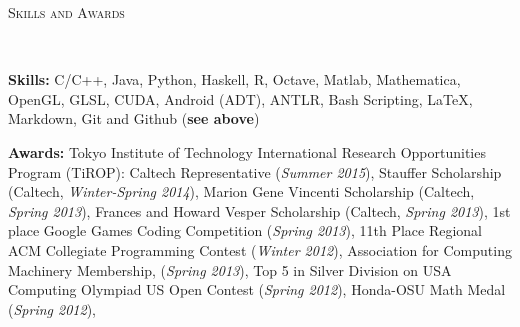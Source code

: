 \documentclass[9pt]{article}
\newenvironment{changemargin}[2]{%
  \begin{list}{}{%
    \setlength{\topsep}{0pt}%
    \setlength{\leftmargin}{#1}%
    \setlength{\rightmargin}{#2}%
    \setlength{\listparindent}{\parindent}%
    \setlength{\itemindent}{\parindent}%
    \setlength{\parsep}{\parskip}%
  }%
  \item[]}{\end{list}
}
\newcommand{\lineover}{
	\begin{changemargin}{-0.05in}{-0.05in}
		\vspace*{-8pt}
		\hrulefill \\
		\vspace*{-2pt}
	\end{changemargin}
}
\newcommand{\header}[1]{
	\begin{changemargin}{-0.5in}{-0.5in}
		\scshape{#1}\\
  	\lineover
	\end{changemargin}
}
\newenvironment{body} {
	\vspace*{-16pt}
	\begin{changemargin}{-0.25in}{-0.5in}
  }	
	{\end{changemargin}
}
\begin{document}
\header{Skills and Awards}
\smallskip
\begin{body}
	\vspace{14pt}
	
		\textbf{Skills:} C/C++, Java, Python, Haskell, R, Octave, Matlab, Mathematica, OpenGL, GLSL, CUDA, Android (ADT), ANTLR, Bash Scripting, \LaTeX, Markdown, Git and Github (\textbf{see above})\\
	
	\medskip
	
	\textbf{Awards:} Tokyo Institute of Technology International Research Opportunities Program (TiROP): Caltech Representative (\emph{Summer 2015}), Stauffer Scholarship (Caltech, \emph{Winter-Spring 2014}), Marion Gene Vincenti Scholarship (Caltech, \emph{Spring 2013}),
        Frances and Howard Vesper Scholarship (Caltech, \emph{Spring 2013}),
        1st place Google Games Coding Competition (\emph{Spring 2013}),
        11th Place Regional ACM Collegiate Programming Contest (\emph{Winter 2012}),
        Association for Computing Machinery Membership, (\emph{Spring 2013}),
        Top 5 in Silver Division on USA Computing Olympiad US Open Contest (\emph{Spring 2012}),
        Honda-OSU Math Medal (\emph{Spring 2012}),
	
	
%
\end{body}
\end{document}
